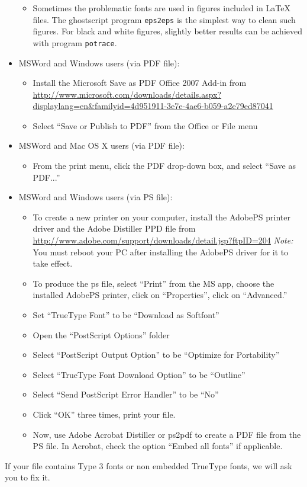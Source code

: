 \documentclass{article} %
\begin{document}
\begin{itemize}
\begin{itemize}
\item Sometimes the problematic fonts are used in figures
included in LaTeX files. The ghostscript program \verb+eps2eps+ is the simplest
way to clean such figures. For black and white figures, slightly better
results can be achieved with program \verb+potrace+.
\end{itemize}
\item MSWord and Windows users (via PDF file):
\begin{itemize}
\item Install the Microsoft Save as PDF Office 2007 Add-in from
\url{http://www.microsoft.com/downloads/details.aspx?displaylang=en\&familyid=4d951911-3e7e-4ae6-b059-a2e79ed87041}
\item Select ``Save or Publish to PDF'' from the Office or File menu
\end{itemize}
\item MSWord and Mac OS X users (via PDF file):
\begin{itemize}
\item From the print menu, click the PDF drop-down box, and select ``Save
as PDF...''
\end{itemize}
\item MSWord and Windows users (via PS file):
\begin{itemize}
\item To create a new printer
on your computer, install the AdobePS printer driver and the Adobe Distiller PPD file from
\url{http://www.adobe.com/support/downloads/detail.jsp?ftpID=204} {\it Note:} You must reboot your PC after installing the
AdobePS driver for it to take effect.
\item To produce the ps file, select ``Print'' from the MS app, choose
the installed AdobePS printer, click on ``Properties'', click on ``Advanced.''
\item Set ``TrueType Font'' to be ``Download as Softfont''
\item Open the ``PostScript Options'' folder
\item Select ``PostScript Output Option'' to be ``Optimize for Portability''
\item Select ``TrueType Font Download Option'' to be ``Outline''
\item Select ``Send PostScript Error Handler'' to be ``No''
\item Click ``OK'' three times, print your file.
\item Now, use Adobe Acrobat Distiller or ps2pdf to create a PDF file from
the PS file. In Acrobat, check the option ``Embed all fonts'' if
applicable.
\end{itemize}

\end{itemize}
If your file contains Type 3 fonts or non embedded TrueType fonts, we will
ask you to fix it.
\end{document}
